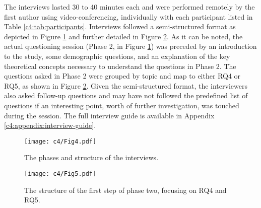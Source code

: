 The interviews lasted 30 to 40 minutes each and were performed remotely by the first author using video-conferencing, individually with each participant listed in Table \ref{c4:tab:participants}.
Interviews followed a semi-structured format \cite{Runeson2012} as depicted in Figure \ref{c4:fig:interview-phases} and further detailed in Figure \ref{c4:fig:interview-questions-sub-phases}.
As it can be noted, the actual questioning session (Phase 2, in Figure \ref{c4:fig:interview-phases}) was preceded by an introduction to the study, some demographic questions, and an explanation of the key theoretical concepts necessary to understand the questions in Phase 2.
The questions asked in Phase 2 were grouped by topic and map to either RQ4 or RQ5, as shown in Figure \ref{c4:fig:interview-questions-sub-phases}.
Given the semi-structured format, the interviewers also asked follow-up questions and may have not followed the predefined list of questions if an interesting point, worth of further investigation, was touched during the session.
The full interview guide is available in Appendix \ref{c4:appendix:interview-guide}.

\begin{figure}
    \centering
    \texttt{[image: c4/Fig4.pdf]}
    \caption{The phases and structure of the interviews.}\label{c4:fig:interview-phases}
\end{figure}

\begin{figure}
    \centering
    \texttt{[image: c4/Fig5.pdf]}
    \caption{The structure of the first step of phase two, focusing on RQ4 and RQ5.}\label{c4:fig:interview-questions-sub-phases}
\end{figure}

